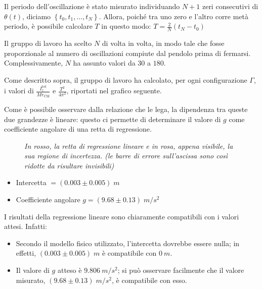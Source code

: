 \documentclass{article}
\begin{document}
\pagebreak
Il periodo dell'oscillazione è stato misurato individuando $N+1$ zeri
consecutivi di $\theta(t)$, diciamo $\left\{t_0,t_1,\dots,t_N\right\}$.
Allora, poiché tra uno zero e l'altro corre metà periodo, è possibile
calcolare $T$ in questo modo: $T = \frac{2}{N}(t_N - t_0)$

Il gruppo di lavoro ha scelto $N$ di volta in volta, in modo tale che
fosse proporzionale al numero di oscillazioni compiute dal pendolo
prima di fermarsi. Complessivamente, $N$ ha assunto valori da $30$ a
$180$.

\vspace{2mm}

Come descritto sopra, il gruppo di lavoro ha calcolato, per ogni
configurazione $\Gamma$,
i valori di $\frac{I_z^\text{tot}}{Mr_\text{CM}}$
e $\frac{T^2}{4\pi^2}$, riportati nel grafico seguente.

Come è possibile osservare dalla relazione che le lega, la dipendenza
tra queste due grandezze è lineare: questo ci permette di determinare
il valore di $g$ come coefficiente angolare di una retta di regressione.

\begin{center}
\begin{figure}[H]
  \caption[]{\emph{
    In rosso, la retta di regressione lineare e in rosa,
    appena visibile, la sua regione di incertezza.
    (le barre di errore sull'ascissa sono così ridotte
    da risultare invisibili)
  }}
\end{figure}
\end{center}

\begin{itemize}
  \item Intercetta $= (0.003 \pm 0.005)\;\unit{m}$
  \item Coefficiente angolare $g = (9.68 \pm 0.13)\;\unit{m\per s^2}$
\end{itemize}
\pagebreak
I risultati della regressione lineare sono chiaramente compatibili
con i valori attesi. Infatti:
\begin{itemize}
  \item Secondo il modello fisico utilizzato, l'intercetta dovrebbe
  essere nulla; in effetti, $(0.003\pm0.005)\;\unit{m}$ è compatibile
  con $\qty{0}{m}$.
  \item Il valore di $g$ atteso è $\qty{9.806}{m\per s^2}$; si può
  osservare facilmente che il valore misurato,
  $(9.68\pm0.13)\;\unit{m \per s^2}$, è compatibile con esso.
\end{itemize}
\end{document}
